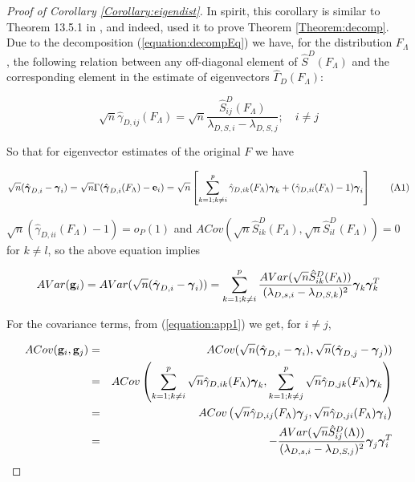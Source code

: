 \begin{proof}[Proof of Corollary \ref{Corollary:eigendist}]
In spirit, this corollary is similar to Theorem 13.5.1 in \cite{anderson}, and indeed, \cite{taskinen12} used it to prove Theorem \ref{Theorem:decomp}. Due to the decomposition (\ref{equation:decompEq}) we have, for the distribution $F_\Lambda$, the following relation between any off-diagonal element of $\hat S^D(F_\Lambda)$ and the corresponding element in the estimate of eigenvectors $\hat\Gamma_D (F_\Lambda)$:

$$ \sqrt n \hat\gamma_{D,ij} (F_\Lambda) = \sqrt n \frac{\hat S^D_{ij} (F_\Lambda)}{\lambda_{D,S,i} - \lambda_{D,S,j}}; \quad i \neq j$$

So that for eigenvector estimates of the original $F$ we have

\begin{equation} \label{equation:app1}
\sqrt n (\hat{{\boldsymbol{\gamma}}}_{D,i} - {\boldsymbol{\gamma}}_i) = \sqrt n \Gamma (\hat {{\boldsymbol{\gamma}}}_{D,i}(F_\Lambda) - {\bf{e}}_i ) = \sqrt n \left[ \sum_{k=1; k \neq i}^p \hat \gamma_{D,ik}(F_\Lambda){\boldsymbol{\gamma}}_k + (\hat \gamma_{D,ii}(F_\Lambda) - 1){\boldsymbol{\gamma}}_i \right] \tag{A1}
\end{equation}

$\sqrt n (\hat \gamma_{D,ii}(F_\Lambda) - 1) =  o_P(1)$ and $ACov(\sqrt n \hat S^D_{ik}(F_\Lambda), \sqrt n \hat S^D_{il}(F_\Lambda)) = 0$ for $k \neq l$, so the above equation implies

$$ AVar({\bf{g}}_i) = AVar (\sqrt n (\hat{{\boldsymbol{\gamma}}}_{D,i} - {\boldsymbol{\gamma}}_i)) = \sum_{k=1; k \neq i}^p \frac{AVar(\sqrt n \hat S^D_{ik}(F_\Lambda))}{(\lambda_{D,s,i} - \lambda_{D,S,k})^2} {\boldsymbol{\gamma}}_k {\boldsymbol{\gamma}}_k^T $$

For the covariance terms, from (\ref{equation:app1}) we get, for $i \neq j$,

\begin{eqnarray*}
ACov({\bf{g}}_i, {\bf{g}}_j) &=& ACov (\sqrt n (\hat{{\boldsymbol{\gamma}}}_{D,i} - {\boldsymbol{\gamma}}_i), \sqrt n (\hat{{\boldsymbol{\gamma}}}_{D,j} - {\boldsymbol{\gamma}}_j))\\
&=& ACov \left( \sum_{k=1; k \neq i}^p \sqrt n \hat \gamma_{D,ik}(F_\Lambda){\boldsymbol{\gamma}}_k, \sum_{k=1; k \neq j}^p \sqrt n \hat \gamma_{D,jk}(F_\Lambda){\boldsymbol{\gamma}}_k \right)\\
&=& ACov \left( \sqrt n \hat \gamma_{D,ij}(F_\Lambda){\boldsymbol{\gamma}}_j, \sqrt n \hat \gamma_{D,ji}(F_\Lambda){\boldsymbol{\gamma}}_i \right)\\
&=& - \frac{AVar(\sqrt n \hat S^D_{ij}(\Lambda))}{(\lambda_{D,s,i} - \lambda_{D,S,j})^2} {\boldsymbol{\gamma}}_j {\boldsymbol{\gamma}}_i^T
\end{eqnarray*}


\end{proof}
